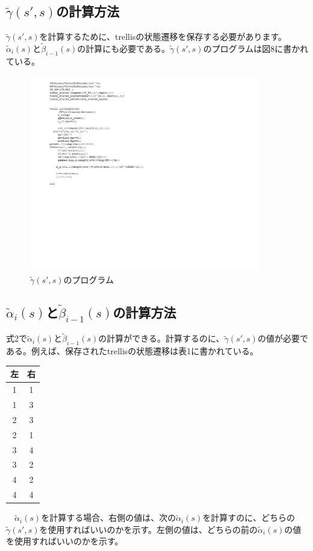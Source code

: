 \documentclass[20 pts]{article}
\begin{document}
\subsection{$\widetilde{\gamma}(s',s)$の計算方法}
$\widetilde{\gamma}(s',s)$を計算するために、trellisの状態遷移を保存する必要があります。$\widetilde{\alpha}_i(s)$と$\widetilde{\beta}_{i-1}(s)$の計算にも必要である。$\widetilde{\gamma}(s',s)$のプログラムは図8に書かれている。
\begin{figure}[h!]
\includegraphics[width=10cm]{zu8.jpg}
\caption{$\widetilde{\gamma}(s',s)$のプログラム}
\label{図2}
\end{figure}


\subsection{ $\widetilde{\alpha}_i(s)$と$\widetilde{\beta}_{i-1}(s)$の計算方法}
式2で$\widetilde{\alpha}_i(s)$と$\widetilde{\beta}_{i-1}(s)$の計算ができる。計算するのに、$\widetilde{\gamma}(s',s)$の値が必要である。例えば、保存されたtrellisの状態遷移は表1に書かれている。
\begin{center}
\begin{tabular}{ |c|c| } 
 \hline
 左 & 右 \\ 
 \hline
 1 & 1 \\ 
 1 & 3  \\ 
 2 & 3  \\ 
 2 & 1 \\ 
 3 & 4  \\ 
 3 & 2  \\ 
 4 & 2 \\ 
 4 & 4  \\ 
 \hline
\end{tabular}
\end{center}
　$\widetilde{\alpha}_i(s)$を計算する場合、右側の値は、次の$\widetilde{\alpha}_i(s)$を計算すのに、どちらの$\widetilde{\gamma}(s',s)$を使用すればいいのかを示す。左側の値は、どちらの前の$\widetilde{\alpha}_i(s)$の値を使用すればいいのかを示す。
\end{document}
